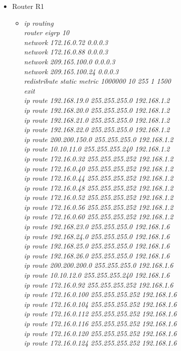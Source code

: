 \documentclass[12pt,a4paper]{report}
\begin{document}
\begin{itemize}
\begin{itemize}
\begin{itemize}
          \end{itemize}
           \item Router R1
        \begin{itemize}
         \item \textit{ip routing\\
router eigrp 10\\
network 172.16.0.72 0.0.0.3\\
network 172.16.0.88 0.0.0.3\\
network 209.165.100.0 0.0.0.3\\
network 209.165.100.24 0.0.0.3\\
redistribute static metric 1000000 10 255 1 1500\\
exit\\
ip route 192.168.19.0 255.255.255.0 192.168.1.2\\
ip route 192.168.20.0 255.255.255.0 192.168.1.2\\
ip route 192.168.21.0 255.255.255.0 192.168.1.2\\
ip route 192.168.22.0 255.255.255.0 192.168.1.2\\
ip route 200.200.150.0 255.255.255.0 192.168.1.2\\
ip route 10.10.11.0 255.255.255.240 192.168.1.2\\
ip route 172.16.0.32 255.255.255.252 192.168.1.2\\
ip route 172.16.0.40 255.255.255.252 192.168.1.2\\
ip route 172.16.0.44 255.255.255.252 192.168.1.2\\
ip route 172.16.0.48 255.255.255.252 192.168.1.2\\
ip route 172.16.0.52 255.255.255.252 192.168.1.2\\
ip route 172.16.0.56 255.255.255.252 192.168.1.2\\
ip route 172.16.0.60 255.255.255.252 192.168.1.2\\
ip route 192.168.23.0 255.255.255.0 192.168.1.6\\
ip route 192.168.24.0 255.255.255.0 192.168.1.6\\
ip route 192.168.25.0 255.255.255.0 192.168.1.6 \\
ip route 192.168.26.0 255.255.255.0 192.168.1.6 \\
ip route 200.200.200.0 255.255.255.0 192.168.1.6 \\
ip route 10.10.12.0 255.255.255.240 192.168.1.6 \\
ip route 172.16.0.92 255.255.255.252 192.168.1.6 \\
ip route 172.16.0.100 255.255.255.252 192.168.1.6 \\
ip route 172.16.0.104 255.255.255.252 192.168.1.6 \\
ip route 172.16.0.112 255.255.255.252 192.168.1.6 \\
ip route 172.16.0.116 255.255.255.252 192.168.1.6 \\
ip route 172.16.0.120 255.255.255.252 192.168.1.6 \\
ip route 172.16.0.124 255.255.255.252 192.168.1.6\\}
         

\end{itemize}
\end{itemize}
\end{itemize}
\end{document}
